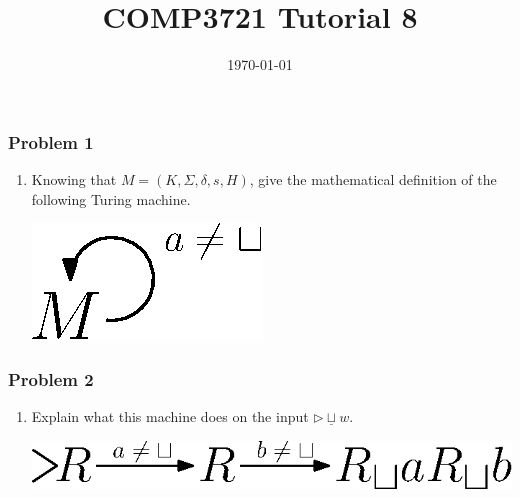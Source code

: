 \documentclass[11.5pt]{beamer}
\title{COMP3721 Tutorial 8}
\author{}
\institute{CSE, HKUST}
\date{\today}
\begin{document}
\begin{frame}
  \titlepage
\end{frame}

\begin{frame}[t]
\frametitle{Problem 1}
\begin{enumerate}[(1)]
\item Knowing that $M = (K,\Sigma, \delta, s, H)$, give the mathematical definition of the following Turing machine.
\begin{center}
\includegraphics[scale = 0.6]{q1.eps}
\end{center}

\vspace{2em}
\end{enumerate}
\end{frame}


\begin{frame}[t]
\frametitle{Problem 2}
\begin{enumerate}[(2)]
\item Explain what this machine does on the input $\triangleright\underline{\sqcup} w$.
\begin{center}
\includegraphics[scale = 0.6]{q2.eps}
\end{center} 

\vspace{2em}
\end{enumerate}
\end{frame}
\end{document}
